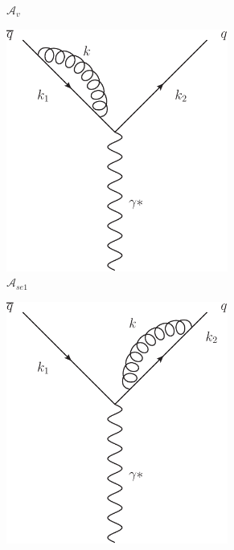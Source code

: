 \begin{figure}[tpb]
\begin{subfigure}[b]{0.48\textwidth}
				\caption{$\mathcal{A}_v$}
				\label{fig:NLOfig_2}
			\end{subfigure}
			\begin{subfigure}[b]{0.48\textwidth}
				\includegraphics[width=0.8\textwidth]{NLOSelfEnergyLeft}
				\caption{$\mathcal{A}_{se1}$}
				\label{fig:NLOfig_3}
			\end{subfigure}
			\begin{subfigure}[b]{0.48\textwidth}
				\includegraphics[width=0.8\textwidth]{NLOSelfEnergyRight}

\end{subfigure}
\end{figure}
